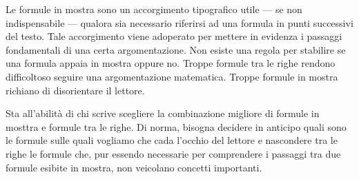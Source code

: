\documentclass[12pt]{article}
\begin{document}
Le formule in mostra sono un accorgimento tipografico utile --- se non indispensabile --- qualora sia necessario riferirsi ad una formula in punti successivi del testo. Tale accorgimento viene adoperato per mettere in evidenza i passaggi fondamentali di una certa argomentazione. Non esiste una regola per stabilire se una formula appaia in mostra oppure no. Troppe formule tra le righe rendono difficoltoso seguire una argomentazione matematica. Troppe formule in mostra richiano di disorientare il lettore. 

Sta all'abilit\`a di chi scrive scegliere la combinazione migliore di formule in mosttra e formule tra le righe. Di norma, bisogna decidere in anticipo quali sono le formule sulle quali vogliamo che cada l'occhio del lettore e nascondere tra le righe le formule che, pur essendo necessarie per comprendere i passaggi tra due formule esibite in mostra, non veicolano concetti importanti.


\vfill\newpage
\end{document}
